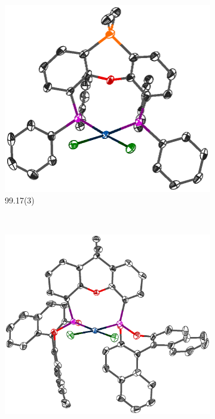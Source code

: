 \begin{figure}[htbp]
        \centering
        \begin{subfigure}[b]{0.45\textwidth}
                \includegraphics[width=\textwidth]{../Othercrystals/PtCl2/630063.eps}
                \caption{99.17(3)\degrees{}\cite{Duren2007}}
                \label{PtCl2SiPh}
        \end{subfigure}%
        ~ 
        \begin{subfigure}[b]{0.45\textwidth}
                \includegraphics[width=\textwidth]{../Othercrystals/PtCl2/295949.eps}

\end{subfigure}
\end{figure}
